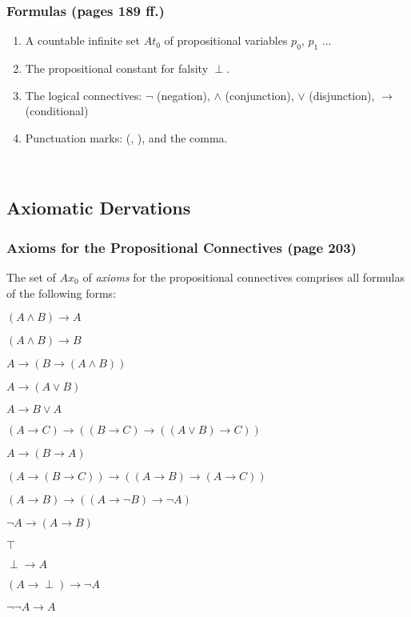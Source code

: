 \documentclass{report}
\begin{document}
 	\subsubsection{Formulas (pages 189 ff.)}
 	\begin{enumerate}
 		\item A countable infinite set $At_0$ of propositional variables $p_0$, $p_1$ ...
 		\item The propositional constant for falsity $\perp$.
 		\item The logical connectives: $\neg$ (negation), $\wedge$ (conjunction), $\vee$ (disjunction), $\rightarrow$ (conditional)
 		\item Punctuation marks: (, ), and the comma.
 	\end{enumerate}
 	\hfill \\ 	
 	
 	\subsection{Axiomatic Dervations}
 	\subsubsection{Axioms for the Propositional Connectives (page 203)}
 	The set of $Ax_0$ of \textit{axioms} for the propositional connectives comprises all formulas of the following forms: \\
 	\begin{compactenum}[(D.1)]
 		\item $(A \wedge B) \rightarrow A$
 		\item $(A \wedge B) \rightarrow B$
 		\item $A \rightarrow (B \rightarrow (A \wedge B))$
 		\item $A \rightarrow (A \vee B)$
 		\item $A \rightarrow B \vee A$
 		\item $(A \rightarrow C) \rightarrow ((B \rightarrow C) \rightarrow ((A \vee B) \rightarrow C))$
 		\item $A \rightarrow (B \rightarrow A)$
 		\item $(A \rightarrow (B \rightarrow C)) \rightarrow ((A \rightarrow B) \rightarrow (A \rightarrow C))$
 		\item $(A \rightarrow B) \rightarrow ((A \rightarrow \neg B) \rightarrow \neg A)$
 		\item $\neg A \rightarrow (A \rightarrow B)$
 		\item $\top$
 		\item $\perp \rightarrow A$
 		\item $(A \rightarrow \perp) \rightarrow \neg A$
 		\item $\neg \neg A \rightarrow A$
 	\end{compactenum}
\end{document}
